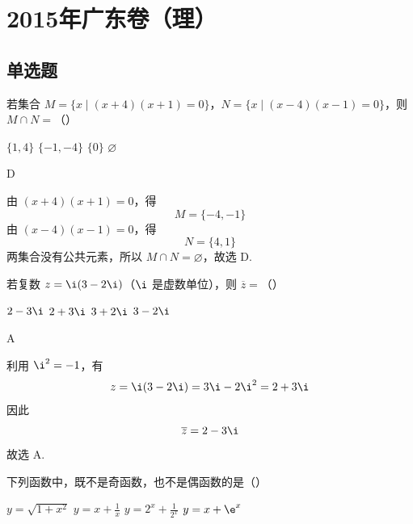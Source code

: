 \chapter{2015年广东卷（理）}


\section{单选题}

\begin{problem}
若集合 \(M = \{x \mid (x + 4)(x + 1) = 0\}\)，\(N = \{x \mid (x - 4)(x - 1) = 0\}\)，则 \(M \cap N =\)（\quad）

\choices
    {\(\{1, 4\}\)}
    {\( \{-1,-4\} \)}
    {\(\{0\}\)}
    {\(\varnothing\)}
\end{problem}

\begin{answer}
D
\end{answer}

\begin{solution}
由 \((x+4)(x+1)=0\)，得
\[
M=\{-4,-1\}
\]
由 \((x-4)(x-1)=0\)，得
\[
N=\{4,1\}
\]
两集合没有公共元素，所以 \(M\cap N=\varnothing\)，故选 D.
\end{solution}

\begin{problem}
若复数 \(z = \i(3 - 2\i)\)（\(\i\) 是虚数单位），则 \(\overline{z} =\)（\quad）

\choices
    {\(2 - 3\i\)}
    {\(2 + 3\i\)}
    {\(3 + 2\i\)}
    {\(3 - 2\i\)}
\end{problem}

\begin{answer}
A
\end{answer}

\begin{solution}
利用 \(\i^2=-1\)，有
\[
z=\i(3-2\i)=3\i-2\i^2=2+3\i
\]
因此
\[
\overline z=2-3\i
\]
故选 A.
\end{solution}

\begin{problem}
下列函数中，既不是奇函数，也不是偶函数的是（\quad）

\choices
    {\( y = \sqrt{1 + x^2} \)}
    {\( y = x + \frac{1}{x} \)}
    {\( y = 2^x + \frac{1}{2^x} \)}
    {\(y = x + \e^{x}\)}
\end{problem}

